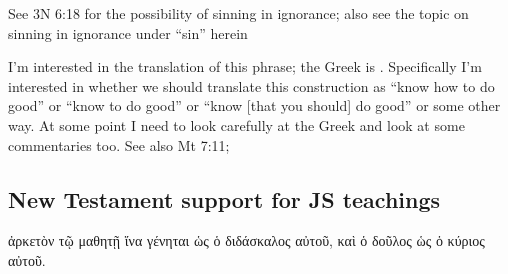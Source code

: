 		\begin{compactdesc}
		
		\item[17$\vert$]
		\begin{compactdesc}
		\item[Sin requires knowledge] See 3N 6:18 for the possibility of sinning in ignorance; also see the topic on sinning in ignorance under ``sin'' herein
		\item[know to do good] I'm interested in the translation of this phrase; the Greek is . Specifically I'm interested in whether we should translate this construction as ``know how to do good'' or ``know to do good'' or ``know [that you should] do good'' or some other way. At some point I need to look carefully at the Greek and look at some commentaries too. See also Mt 7:11; 
		\end{compactdesc}
		
		\end{compactdesc}
		
\subsection{New Testament support for JS teachings} %

	\begin{compactdesc}
		\item[Mt 10:25] \textgreek{ἀρκετὸν τῷ μαθητῇ ἵνα γένηται ὡς ὁ διδάσκαλος αὐτοῦ, καὶ ὁ δοῦλος ὡς ὁ κύριος αὐτοῦ}.
	\end{compactdesc}